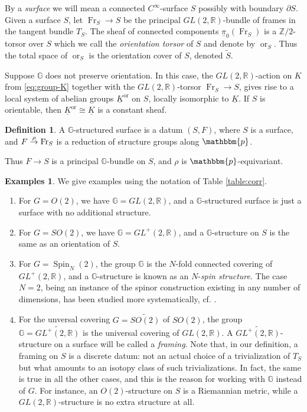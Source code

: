 \documentclass[english,11pt,leqno]{article}
\def\GG{\mathbb{G}}
\def\RR{\mathbb{R}}
\def\ZZ{\mathbb{Z}}
\def\on{\operatorname}
\def\Fr{\on{Fr}}
\def\orr{{\on{or}}}
\def\p{\mathbbm{p}}
\theoremstyle{definition}
\newtheorem{defi}[thm]{Definition}
\newtheorem{exas}[thm]{Examples}
\theoremstyle{remark}
\numberwithin{equation}{section}
\begin{document}
By a {\em surface} we will mean a  connected $C^\infty$-surface $S$ possibly with boundary
$\partial S$. Given a surface $S$, let $\Fr_S\to S$ be the principal $GL(2,\RR)$-bundle of frames in
the tangent bundle $T_S$. The sheaf of connected components $\underline{\pi}_0(\Fr_S)$ is a
$\ZZ/2$-torsor over $S$ which we call the {\em orientation torsor} of $S$ and denote by $\orr_S$. Thus
the total space of $\orr_S$ is the orientation cover of $S$, denoted $\widetilde S$. 

Suppose $\GG$ does not preserve orientation. In this case, the $GL(2,\RR)$-action on $K$ from
\eqref {eq:group-K} together with the $GL(2,\RR)$-torsor $\Fr_S\to S$,  gives rise to a local
system of abelian groups $\underline K^\orr$ on $S$, locally isomorphic to $\underline{K}$. If $S$
is orientable, then $\underline K^\orr \cong \underline K$ is a constant sheaf.

\begin{defi}
A $\GG$-structured surface is a datum $(S,F)$, where $S$ is a surface, and $F\buildrel\rho\over\to \Fr_S$ is a reduction
of structure groups along $\p$. 
\end{defi}

Thus $F\to S$ is a principal $\GG$-bundle on $S$, and $\rho$ is $\p$-equivariant. 

\begin{exas} We give examples using the notation of Table \ref{table:corr}.
	\begin{enumerate}[label=(\alph{*})]
		\item  For $G=O(2)$, we have $\GG=GL(2,\RR)$, and a $\GG$-structured surface is just a surface with no additional structure.

		\item For $G=SO(2)$, we have $\GG=GL^+(2,\RR)$, and a $\GG$-structure on $S$ is the
			same as an orientation of $S$.

		\item For $G=\on{Spin}_N(2)$, the group $\GG$ is the $N$-fold connected covering of $GL^+(2,\RR)$, and
		a $\GG$-structure is known as an $N$-{\em spin structure}.  The case $N=2$, being an instance
		of the spinor construction existing in any number of dimensions, has been studied more systematically, cf. \cite{johnson}. 

	\item For the unversal covering $G=\widetilde{SO(2)}$ of $SO(2)$, the group $\GG=\widetilde{GL^+(2,\RR)}$
		is the universal covering of $GL(2,\RR)$. A $\widetilde{GL^+(2,\RR)}$-structure on a
		surface will be called a {\em framing}. Note that, in our definition, a framing on
		$S$ is a discrete datum: not an actual choice of a trivialization of $T_S$ but what
		amounts to an isotopy class of such trivializations. In fact, the same is true in
		all the other cases, and this is the reason for working with $\GG$ instead of $G$.
		For instance, an $O(2)$-structure on $S$ is a Riemannian metric, while a
		$GL(2,\RR)$-structure is no extra structure at all. 
	\end{enumerate}
\end{exas}
\end{document}
